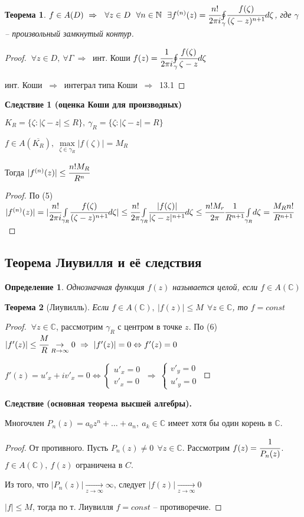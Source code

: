 \documentclass[draft]{report}
\newcommand{\then}{\ \Rightarrow\ }
\renewcommand{\C}{\mathbb{C}}
\newcommand{\N}{\mathbb{N}}
\newcommand{\mint}[2]{\underset{#1}{\overset{#2}{\int}}}
\newcommand{\moint}[1]{\underset{#1}{\oint}}
\newcommand{\mmax}[1]{\underset{#1}{\max}}
\newcommand{\LRA}{\Leftrightarrow}
\renewcommand{\bar}{\overline}
\newcommand{\g}{\gamma}
\newcommand{\G}{\Gamma}
\newcommand{\E}{\ \exists}
\newcommand{\F}{\ \forall}
\newcommand{\sys}[1]{\left\{\begin{matrix}#1\end{matrix}\right.}
\newcommand{\opr}[1]{\begin{opred}#1\end{opred}}
\newtheorem*{theor}{Теорема}
\newtheorem*{opred}{Определение}
\theoremstyle{remark}
\begin{document}
\begin{theor}
$f\in A(D)\then \F z\in D\ \F n\in\N\ \E f^{(n)}(z)=\cfrac{n!}{2\pi i}\moint{\g}\cfrac{f(\zeta)}{(\zeta-z)^{n+1}}d\zeta$, где $\g$ -- произвольный замкнутый контур.
\end{theor}
\begin{proof}
$\F z\in D,\F \G \then$ инт. Коши $f(z)=\cfrac{1}{2\pi i}\moint{\g}\cfrac{f(\zeta)}{\zeta-z}d\zeta$

инт. Коши $\then$ интеграл типа Коши $\then$ 13.1
\end{proof}
{\bfseries Следствие 1 (оценка Коши для производных)}

$K_R=\{\zeta\colon|\zeta-z|\leq R\},\ \g_R=\{\zeta\colon|\zeta-z|=R\}$

$f\in A(\bar{K_R}),\ \mmax{\zeta\in\g_R}|f(\zeta)|=M_R$

Тогда $|f^{(n)}(z)|\leq\cfrac{n!M_R}{R^n}$
\begin{proof}
По (5) $|f^{(n)}(z)|=|\cfrac{n!}{2\pi i}\mint{\g_R}{}\cfrac{f(\zeta)}{(\zeta-z)^{n+1}}d\zeta|\leq \cfrac {n!}{2\pi}\mint{\g_R}{}\cfrac{|f(\zeta)|}{|\zeta-z|^{n+1}}d\zeta\leq\cfrac{n!M_r}{2\pi}\cfrac1{R^{n+1}}\mint{\g_R}{}d\zeta=\cfrac{M_Rn!}{R^{n+1}}$
\end{proof}

\subsection{Теорема Лиувилля и её следствия}

\opr{Однозначная функция $f(z)$ называется целой, если $f\in A(\C)$}
\begin{theor}[Лиувилль]
Если $f\in A(\C),\ |f(z)|\leq M\ \F z\in \C$, то $f=const$
\end{theor}
\begin{proof}
$\F z\in\C$, рассмотрим $\g_R$ с центром в точке $z$. По (6) $|f'(z)|\leq \cfrac MR\underset{R\to\infty}{\to} 0 \then |f'(z)|=0 \LRA f'(z)=0$

$f'(z)=u'_x+iv'_x=0\LRA \sys{u'_x=0 \\ v'_x=0} \then \sys{v'_y=0 \\ u'_y=0}$
\end{proof}
{\bfseries Следствие (основная теорема высшей алгебры).}

Многочлен $P_n(z)=a_0z^n+\ldots+a_n,\ a_k\in\C$ имеет хотя бы один корень в $\C$.
\begin{proof}
От противного. Пусть $P_n(z)\neq0\ \F z\in\C$. Рассмотрим $f(z)=\cfrac 1{P_n(z)}$. $f\in A(\C),\ f(z)$ ограничена в $C$.

Из того, что $|P_n(z)|\underset{z\to\infty}{\to}\infty$, следует $|f(z)|\underset{z\to\infty}{\to}0$

$|f|\leq M$, тогда по т. Лиувилля $f=const$ -- противоречие.
\end{proof}
\end{document}
